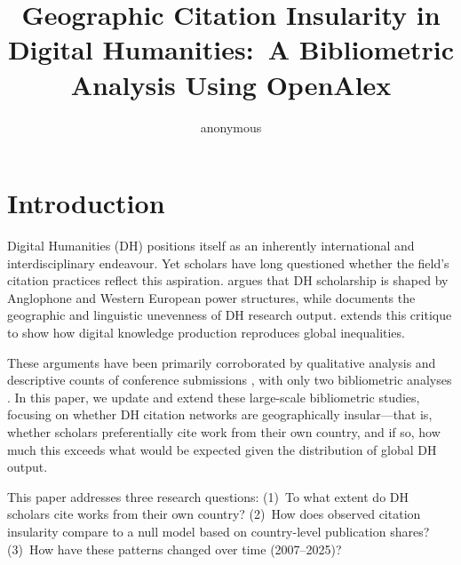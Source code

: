 \documentclass[twoside]{article}
\begin{document}

\title{Geographic Citation Insularity in Digital Humanities:\ A Bibliometric Analysis Using OpenAlex} %

\author[1]{anonymous }



\maketitle   
\thispagestyle{empty}



\section{Introduction}
Digital Humanities (DH) positions itself as an inherently international and interdisciplinary endeavour. Yet scholars have long questioned whether the field's citation practices reflect this aspiration. \textcite{fiormonte2012} argues that DH scholarship is shaped by Anglophone and Western European power structures, while \textcite{galina2014} documents the geographic and linguistic unevenness of DH research output. \textcite{risam2019} extends this critique to show how digital knowledge production reproduces global inequalities.

These arguments have been primarily corroborated by qualitative analysis and descriptive counts of conference submissions \parencite{weingart2017}, with only two bibliometric analyses \parencite{spinaci2022,tang2017}. In this paper, we update and extend these large-scale bibliometric studies, focusing on whether DH citation networks are geographically insular---that is, whether scholars preferentially cite work from their own country, and if so, how much this exceeds what would be expected given the distribution of global DH output.

This paper addresses three research questions: (1)~To what extent do DH scholars cite works from their own country? (2)~How does observed citation insularity compare to a null model based on country-level publication shares? (3)~How have these patterns changed over time (2007--2025)?
\end{document}
